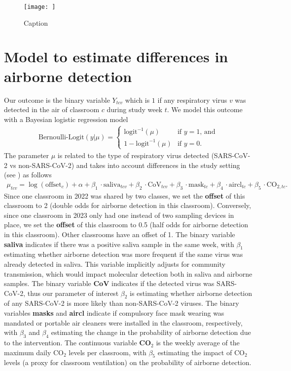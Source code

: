 \documentclass[fleqn,11pt]{wlscirep_supp}
\begin{document}
\clearpage

\begin{figure}
    \centering
    \texttt{[image: ]}
    \caption{Caption}
    \label{fig:enter-label}
\end{figure}

\clearpage

\section*{Model to estimate differences in airborne detection}\label{sec:model}

Our outcome is the binary variable $Y_{tcv}$ which is $1$ if any respiratory virus $v$ was detected in the air of classroom $c$ during study week $t$. We model this outcome with a Bayesian logistic regression model
\begin{align}
    \text{Bernoulli-Logit}(y|\mu) = \begin{cases}
        \text{logit}^{-1}(\mu) & \text{if }y=1\text{, and} \\
        1-\text{logit}^{-1}(\mu) & \text{if }y=0.
    \end{cases}
\end{align}
The parameter $\mu$ is related to the type of respiratory virus detected (SARS-CoV-2 vs non-SARS-CoV-2) and takes into account differences in the study setting (see ) as follows
\begin{align}
    \mu_{tcv} = \log(\text{offset}_c) + \alpha + \beta_1\,\cdot\text{saliva}_{tcv} + \beta_2\,\cdot\text{CoV}_{tcv} + \beta_3\,\cdot\text{mask}_{tc} + \beta_4\,\cdot\text{aircl}_{tc} + \beta_5\,\cdot\text{CO}_{2,tc}.
\end{align}
Since one classroom in 2022 was shared by two classes, we set the \textbf{offset} of this classroom to 2 (double odds for airborne detection in this classroom). Conversely, since one classroom in 2023 only had one instead of two sampling devices in place, we set the \textbf{offset} of this classroom to 0.5 (half odds for airborne detection in this classroom). Other classrooms have an offset of 1. The binary variable \textbf{saliva} indicates if there was a positive saliva sample in the same week, with $\beta_1$ estimating whether airborne detection was more frequent if the same virus was already detected in saliva. This variable implicitly adjusts for community transmission, which would impact molecular detection both in saliva and airborne samples. The binary variable \textbf{CoV} indicates if the detected virus was SARS-CoV-2, thus our parameter of interest $\beta_2$ is estimating whether airborne detection of any SARS-CoV-2 is more likely than non-SARS-CoV-2 viruses. The binary variables \textbf{masks} and \textbf{aircl} indicate if compulsory face mask wearing was mandated or portable air cleaners were installed in the classroom, respectively, with $\beta_3$ and $\beta_4$ estimating the change in the probability of airborne detection due to the intervention. The continuous variable \textbf{CO}$_2$ is the weekly average of the maximum daily CO$_2$ levels per classroom, with $\beta_5$ estimating the impact of CO$_2$ levels (a proxy for classroom ventilation) on the probability of airborne detection.
\end{document}
